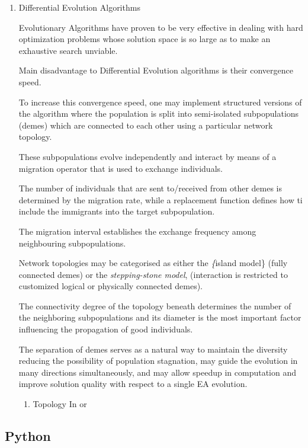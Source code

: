 \documentclass[11pt]{article}
\begin{document}
\begin{enumerate}
\item Differential Evolution Algorithms
\label{sec:org2c8237b}

Evolutionary Algorithms have proven to be very effective in dealing
with hard optimization problems whose solution space is so large as
to make an exhaustive search unviable. 

Main disadvantage to Differential Evolution algorithms is their
convergence speed. 

To increase this convergence speed, one may implement structured
versions of the algorithm where the population is split into
semi-isolated subpopulations (demes) which are connected to each other
using a particular network topology. 

These subpopulations evolve independently and interact by means of a
migration operator that is used to exchange individuals. 

The number of individuals that are sent to/received from other demes
is determined by the migration rate, while a replacement function
defines how ti include the immigrants into the target subpopulation. 

The migration interval establishes the exchange frequency among
neighbouring subpopulations. 

Network topologies may be categorised as either the \emph\{island
model\} (fully connected demes) or the \emph{stepping-stone model},
(interaction is restricted to customized logical or physically
connected demes).  

The connectivity degree of the topology beneath determines
the number of the neighboring subpopulations and its diameter is the
most important factor influencing the propagation of good individuals.

The separation of demes serves as a natural way to maintain the diversity
reducing the possibility of population stagnation, may guide the evolution
in many directions simultaneously, and may allow speedup in computation and
improve solution quality with respect to a single EA evolution.

\begin{enumerate}
\item Topology
\label{sec:org83f3217}
In or
\end{enumerate}
\end{enumerate}

\subsection{Python}
\label{sec:org0b81919}
\end{document}
